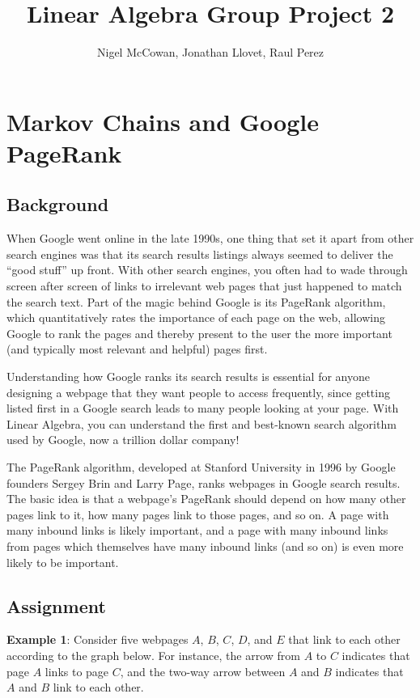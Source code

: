 \documentclass{article}
\begin{document}
\title{Linear Algebra Group Project 2}
\author{Nigel McCowan, Jonathan Llovet, Raul Perez}
\maketitle

\section{Markov Chains and Google PageRank}

\subsection{Background}

When Google went online in the late 1990s, one thing that set it apart from other search engines was that its search results listings always seemed to deliver the ``good stuff'' up front. With other search engines, you often had to wade through screen after screen of links to irrelevant web pages that just happened to match the search text. Part of the magic behind Google is its PageRank algorithm, which quantitatively rates the importance of each page on the web, allowing Google to rank the pages and thereby present to the user the more important (and typically most relevant and helpful) pages first.

Understanding how Google ranks its search results is essential for anyone designing a webpage that they want people to access frequently, since getting listed first in a Google search leads to many people looking at your page. With Linear Algebra, you can understand the first and best-known search algorithm used by Google, now a trillion dollar company!

The PageRank algorithm, developed at Stanford University in 1996 by Google founders Sergey Brin and Larry Page, ranks webpages in Google search results. The basic idea is that a webpage's PageRank should depend on how many other pages link to it, how many pages link to those pages, and so on. A page with many inbound links is likely important, and a page with many inbound links from pages which themselves have many inbound links (and so on) is even more likely to be important.

\subsection{Assignment}

\textbf{Example 1}: Consider five webpages $A$, $B$, $C$, $D$, and $E$ that link to each other according to the graph below. For instance, the arrow from $A$ to $C$ indicates that page $A$ links to page $C$, and the two-way arrow between $A$ and $B$ indicates that $A$ and $B$ link to each other.
\end{document}
